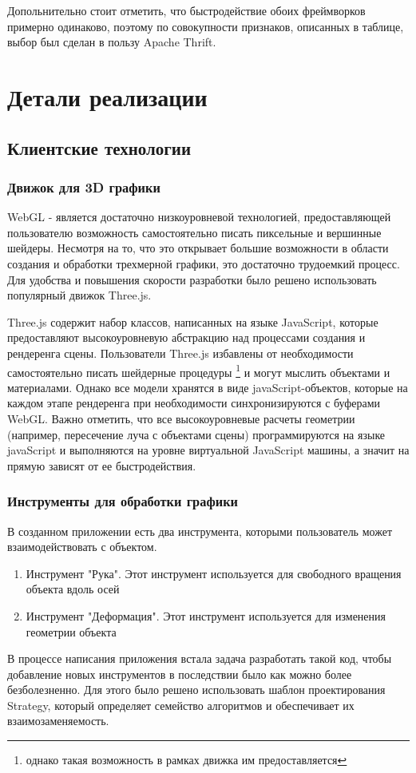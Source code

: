 \documentclass[12pt, a4paper]{article}
\let\stdsection\section
\renewcommand\section{\newpage\stdsection}
\begin{document}
Допольнительно стоит отметить, что быстродействие обоих фреймворков примерно
одинаково, поэтому по совокупности признаков, описанных в таблице, выбор был
сделан в пользу Apache Thrift.

\section{Детали реализации}
\subsection{Клиентские технологии}
\subsubsection{Движок для 3D графики}
WebGL - является достаточно низкоуровневой технологией, предоставляющей
пользователю возможность самостоятельно писать пиксельные и вершинные шейдеры.
Несмотря на то, что это открывает большие возможности в области создания и
обработки трехмерной графики, это достаточно трудоемкий процесс. Для
удобства и повышения скорости разработки было решено использовать популярный
движок Three.js.

Three.js содержит набор классов, написанных на языке JavaScript, которые
предоставляют высокоуровневую абстракцию над процессами создания и рендеренга
сцены. Пользователи Three.js избавлены от необходимости самостоятельно писать
шейдерные процедуры \footnote{однако такая возможность в рамках движка им
предоставляется} и могут мыслить объектами и материалами. Однако все модели
хранятся в виде javaScript-объектов, которые на каждом этапе рендеренга при
необходимости синхронизируются с буферами WebGL. Важно отметить, что все
высокоуровневые расчеты геометрии (например, пересечение луча с объектами сцены)
программируются на языке javaScript и выполняются на уровне виртуальной
JavaScript машины, а значит на прямую зависят от ее быстродействия.

\subsubsection{Инструменты для обработки графики}
В созданном приложении есть два инструмента, которыми пользователь может
взаимодействовать с объектом.
\begin{enumerate}
    \item Инструмент "Рука". Этот инструмент используется для свободного
    вращения объекта вдоль осей
    \item Инструмент "Деформация". Этот инструмент используется для изменения
    геометрии объекта
\end{enumerate}
В процессе написания приложения встала задача разработать такой код, чтобы
добавление новых инструментов в последствии было как можно более безболезненно.
Для этого было решено использовать шаблон проектирования Strategy, который
определяет семейство алгоритмов и обеспечивает их взаимозаменяемость.
\end{document}
